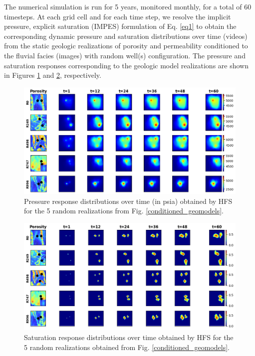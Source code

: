 \documentclass[10pt, twoside]{article}
\begin{document}
The numerical simulation is run for 5 years, monitored monthly, for a total of 60 timesteps. At each grid cell and for each time step, we resolve the implicit pressure, explicit saturation (IMPES) formulation of Eq. \eqref{eq1} to obtain the corresponding dynamic pressure and saturation distributions over time (videos) from the static geologic realizations of porosity and permeability conditioned to the fluvial facies (images) with random well(s) configuration. The pressure and saturation responses corresponding to the geologic model realizations are shown in Figures \ref{pres_response} and \ref{sat_response}, respectively.

\begin{figure}[t]
    \centering
    \includegraphics[width=\textwidth]{figures/pres_response.png}
    \caption{Pressure response distributions over time (in psia) obtained by HFS for the 5 random realizations from Fig. \ref{conditioned_geomodels}.}
    \label{pres_response}
\end{figure}

\begin{figure}[t]
    \centering
    \includegraphics[width=\textwidth]{figures/sat_response.png}
    \caption{Saturation response distributions over time obtained by HFS for the 5 random realizations obtained from Fig. \ref{conditioned_geomodels}.}
    \label{sat_response}
\end{figure}
\end{document}
